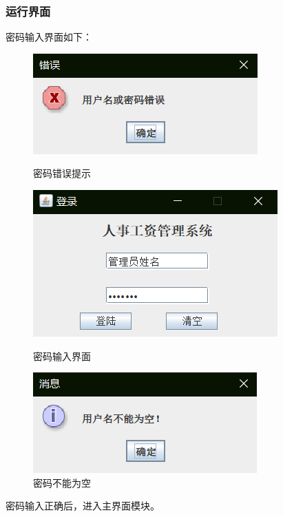 \documentclass[withoutpreface,bwprint]{cumcmthesis} %
\begin{document}
\subsubsection{运行界面}
密码输入界面如下：
\begin{figure}[H]
	\centering
	\begin{minipage}[t]{0.3\linewidth}
		\centering
		\includegraphics[width=1\linewidth]{login2}
		\caption{密码错误提示}
	\end{minipage}
	\begin{minipage}[t]{0.29\linewidth}
		\centering
		\includegraphics[width=1\linewidth]{login1}
		\caption{密码输入界面}
	\end{minipage}
	\begin{minipage}[t]{0.3\linewidth}
		\centering
		\includegraphics[width=1\linewidth]{login3}
		\caption{密码不能为空}
	\end{minipage}
\end{figure}
密码输入正确后，进入主界面模块。
\end{document}
